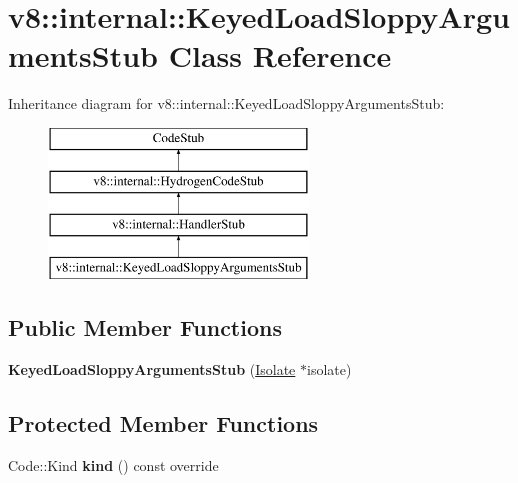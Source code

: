 \hypertarget{classv8_1_1internal_1_1_keyed_load_sloppy_arguments_stub}{}\section{v8\+:\+:internal\+:\+:Keyed\+Load\+Sloppy\+Arguments\+Stub Class Reference}
\label{classv8_1_1internal_1_1_keyed_load_sloppy_arguments_stub}
Inheritance diagram for v8\+:\+:internal\+:\+:Keyed\+Load\+Sloppy\+Arguments\+Stub\+:\begin{figure}[H]
\begin{center}
\leavevmode
\includegraphics[height=4.000000cm]{classv8_1_1internal_1_1_keyed_load_sloppy_arguments_stub}
\end{center}
\end{figure}
\subsection*{Public Member Functions}
\begin{DoxyCompactItemize}
\item 
{\bfseries Keyed\+Load\+Sloppy\+Arguments\+Stub} (\hyperlink{classv8_1_1internal_1_1_isolate}{Isolate} $\ast$isolate)\hypertarget{classv8_1_1internal_1_1_keyed_load_sloppy_arguments_stub_ab6578efd2f698797b1725702d876015f}{}\label{classv8_1_1internal_1_1_keyed_load_sloppy_arguments_stub_ab6578efd2f698797b1725702d876015f}

\end{DoxyCompactItemize}
\subsection*{Protected Member Functions}
\begin{DoxyCompactItemize}
\item 
Code\+::\+Kind {\bfseries kind} () const  override\hypertarget{classv8_1_1internal_1_1_keyed_load_sloppy_arguments_stub_a52c55caef0a6417c05d505c5bcdde17e}{}\label{classv8_1_1internal_1_1_keyed_load_sloppy_arguments_stub_a52c55caef0a6417c05d505c5bcdde17e}

\end{DoxyCompactItemize}
